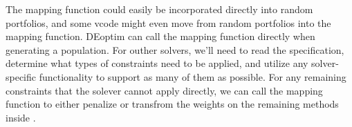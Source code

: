 \documentclass[12pt,letterpaper,english]{article}
\begin{document}
\begin{description}
The mapping function could easily be incorporated directly into random portfolios, and some vcode might even move from random portfolios into the mapping function.  DEoptim can call the mapping function directly when generating a population.  For outher solvers, we'll need to read the specification, determine what types of constraints need to be applied, and utilize any solver-specific functionality to support as many of them as possible.  For any remaining constraints that the solever cannot apply directly, we can call the mapping function to either penalize or transfrom the weights on the remaining methods inside .

\end{description}



\end{document}
